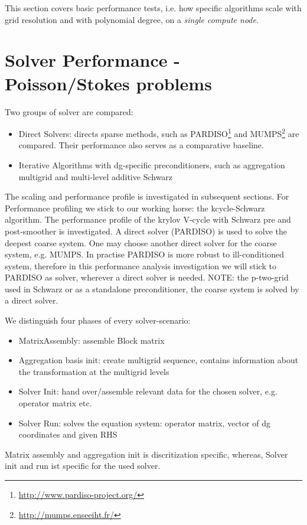 This section covers basic performance tests, i.e. how specific algorithms scale
with grid resolution and with polynomial degree, on a \emph{single compute node}.

\section{Solver Performance - Poisson/Stokes problems}
\label{sec:SolverPerformancePoisson}
Two groups of solver are compared:
\begin{itemize}
\item
Direct Solvers: directs sparse methods, such as PARDISO\footnote{
\url{http://www.pardiso-project.org/}}
and MUMPS\footnote{
\url{http://mumps.enseeiht.fr/}}
are compared.
Their performance also serves as a comparative baseline.


\item
Iterative Algorithms with \ac{dg}-specific preconditioners, such as aggregation multigrid
and multi-level additive Schwarz
\end{itemize}

The scaling and performance profile is investigated in subsequent sections. For Performance profiling we stick to our working horse: the kcycle-Schwarz algorithm.
The performance profile of the krylov V-cycle with Schwarz pre and post-smoother is investigated. A direct solver (PARDISO) is used to solve the deepest coarse system. One may choose another direct solver for the coarse system, e.g. MUMPS. In practise PARDISO is more robust to ill-conditioned system, therefore in this performance analysis investigation we will stick to PARDISO as solver, wherever a direct solver is needed.
NOTE: the p-two-grid used in Schwarz or as a standalone preconditioner, the coarse system is solved by a direct solver.

We distinguish four phases of every solver-scenario: 
\begin{itemize}
	\item MatrixAssembly: assemble Block matrix
	\item Aggregation basis init: create multigrid sequence, contains information about the transformation at the multigrid levels
	\item Solver Init: hand over/assemble relevant data for the chosen solver, e.g. operator matrix etc.
	\item Solver Run: solves the equation system: operator matrix, vector of dg coordinates and given RHS 
\end{itemize}
Matrix assembly and aggregation init is discritization specific, whereas, Solver init and run ist specific for the used solver.

